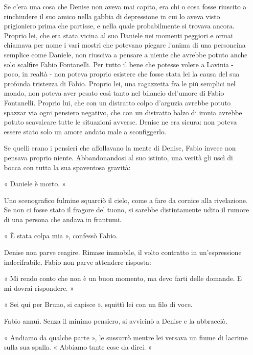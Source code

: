 Se c'era una cosa che Denise non aveva mai capito, era chi o cosa fosse riuscito a rinchiudere il suo amico nella gabbia di depressione in cui lo aveva visto prigioniero prima che partisse, e nella quale probabilmente si trovava ancora. Proprio lei, che era stata vicina al suo Daniele nei momenti peggiori e ormai chiamava per nome i vari mostri che potevano piegare l'anima di una personcina semplice come Daniele, non riusciva a pensare a niente che avrebbe potuto anche solo scalfire Fabio Fontanelli. Per tutto il bene che potesse volere a Lavinia - poco, in realtà - non poteva proprio esistere che fosse stata lei la causa del sua profonda tristezza di Fabio. Proprio lei, una ragazzetta fra le più semplici nel mondo, non poteva aver pesato così tanto nel bilancio del'umore di Fabio Fontanelli. Proprio lui, che con un distratto colpo d'arguzia avrebbe potuto spazzar via ogni pensiero negativo, che con un distratto balzo di ironia avrebbe potuto scavalcare tutte le situazioni avverse. Denise ne era sicura: non poteva essere stato solo un amore andato male a sconfiggerlo.

Se quelli erano i pensieri che affollavano la mente di Denise, Fabio invece non pensava proprio niente. Abbandonandosi al suo istinto, una verità gli uscì di bocca con tutta la sua spaventosa gravità:

« Daniele è morto. »

Uno scenografico fulmine squarciò il cielo, come a fare da cornice alla rivelazione. Se non ci fosse stato il fragore del tuono, si sarebbe distintamente udito il rumore di una persona che andava in frantumi.

« È stata colpa mia », confessò Fabio.

Denise non parve reagire. Rimase immobile, il volto contratto in un'espressione indecifrabile. Fabio non parve attendere risposta:

« Mi rendo conto che non è un buon momento, ma devo farti delle domande. E mi dovrai rispondere. »

« Sei qui per Bruno, si capisce », squittì lei con un filo di voce.

Fabio annuì. Senza il minimo pensiero, si avvicinò a Denise e la abbracciò.

« Andiamo da qualche parte », le sussurrò mentre lei versava un fiume di lacrime sulla sua spalla. « Abbiamo tante cose da dirci. »
